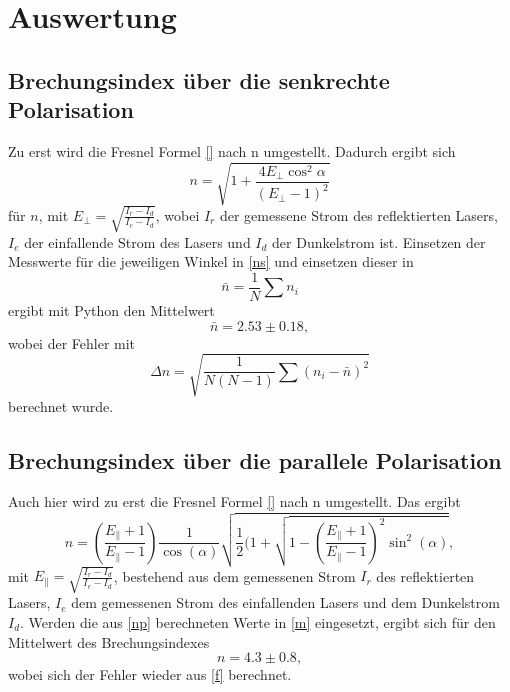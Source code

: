 \section{Auswertung}
\label{sec:Auswertung}

\subsection{Brechungsindex über die senkrechte Polarisation}
Zu erst wird die Fresnel Formel \eqref{} nach n umgestellt. Dadurch ergibt sich 
\begin{equation}
  n=\sqrt{1+\frac{4E_{\bot}\cos^2{\alpha}}{(E_{\bot}-1)^2}}
  \label{ns}
\end{equation}
für $n$, mit $E_{\bot}=\sqrt{\frac{I_r-I_d}{I_e-I_d}}$, wobei $I_r$ der gemessene Strom des reflektierten Lasers, $I_e$ der einfallende Strom des Lasers und $I_d$ der Dunkelstrom ist. Einsetzen der Messwerte für die jeweiligen Winkel in \eqref{ns} und einsetzen dieser in
\begin{equation}
  \bar n=\frac{1}{N}\sum n_i
  \label{m}
\end{equation}
ergibt mit Python den Mittelwert 
\begin{equation*}
  \bar n=2.53 \pm 0.18,
\end{equation*}
wobei der Fehler mit
\begin{equation}
  \Delta n=\sqrt{\frac{1}{N(N-1)}\sum (n_i-\bar n)^2}
  \label{f}
\end{equation}
berechnet wurde. 

\subsection{Brechungsindex über die parallele Polarisation}
Auch hier wird zu erst die Fresnel Formel \eqref{} nach n umgestellt. Das ergibt
\begin{equation}
  n=\left(\frac{E_{\|}+1}{E_{\|}-1}\right)\frac{1}{\cos(\alpha)}\sqrt{\frac{1}{2}(1+\sqrt{1-\left(\frac{E_{\|}+1}{E_{\|}-1}\right)^2\sin^2(\alpha)}},
  \label{np}
\end{equation}
mit $E_{\|}=\sqrt{\frac{I_r-I_d}{I_e-I_d}}$, bestehend aus dem gemessenen Strom $I_r$ des reflektierten Lasers, $I_e$ dem gemessenen Strom des einfallenden Lasers und dem Dunkelstrom $I_d$. Werden die aus \eqref{np} berechneten Werte in \eqref{m} eingesetzt, ergibt sich für den Mittelwert des Brechungsindexes 
\begin{equation*}
  n=4.3 \pm 0.8,
\end{equation*}
wobei sich der Fehler wieder aus \eqref{f} berechnet.

